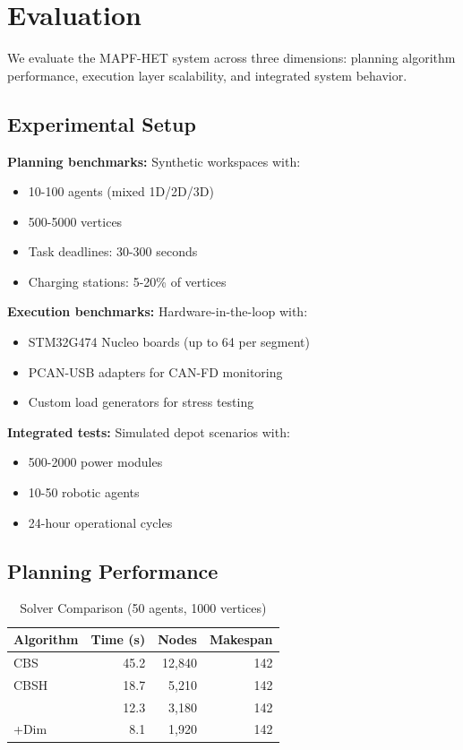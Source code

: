 \section{Evaluation}
\label{sec:evaluation}

We evaluate the MAPF-HET system across three dimensions: planning algorithm performance, execution layer scalability, and integrated system behavior.

\subsection{Experimental Setup}

\textbf{Planning benchmarks:} Synthetic workspaces with:
\begin{itemize}
    \item 10-100 agents (mixed 1D/2D/3D)
    \item 500-5000 vertices
    \item Task deadlines: 30-300 seconds
    \item Charging stations: 5-20\% of vertices
\end{itemize}

\textbf{Execution benchmarks:} Hardware-in-the-loop with:
\begin{itemize}
    \item STM32G474 Nucleo boards (up to 64 per segment)
    \item PCAN-USB adapters for CAN-FD monitoring
    \item Custom load generators for stress testing
\end{itemize}

\textbf{Integrated tests:} Simulated depot scenarios with:
\begin{itemize}
    \item 500-2000 power modules
    \item 10-50 robotic agents
    \item 24-hour operational cycles
\end{itemize}

\subsection{Planning Performance}

\begin{table}[htbp]
\centering
\caption{Solver Comparison (50 agents, 1000 vertices)}
\label{tab:planning}
\begin{tabular}{@{}lrrr@{}}
\toprule
Algorithm & Time (s) & Nodes & Makespan \\
\midrule
CBS & 45.2 & 12,840 & 142 \\
CBSH & 18.7 & 5,210 & 142 \\
\mixedcbs{} & 12.3 & 3,180 & 142 \\
\mixedcbs{}+Dim & 8.1 & 1,920 & 142 \\
\bottomrule
\end{tabular}
\end{table}

